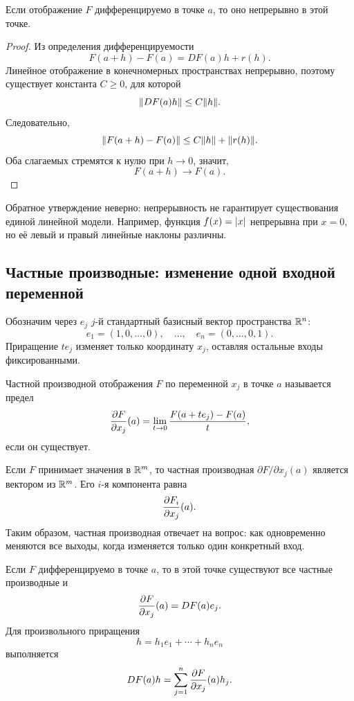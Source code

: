 \begin{theorem}
Если отображение \(F\) дифференцируемо в точке \(a\), то оно непрерывно в этой точке.
\end{theorem}

\begin{proof}
Из определения дифференцируемости
\[
F(a+h)-F(a)=DF(a)h+r(h).
\]
Линейное отображение в конечномерных пространствах непрерывно, поэтому существует константа \(C\geq0\), для которой
\[
\lVert DF(a)h\rVert\leq C\lVert h\rVert.
\]
Следовательно,
\[
\lVert F(a+h)-F(a)\rVert
\leq
C\lVert h\rVert+\lVert r(h)\rVert.
\]
Оба слагаемых стремятся к нулю при \(h\to0\), значит,
\[
F(a+h)\to F(a).
\]
\end{proof}

Обратное утверждение неверно: непрерывность не гарантирует существования единой линейной модели. Например, функция \(f(x)=\lvert x\rvert\) непрерывна при \(x=0\), но её левый и правый линейные наклоны различны.

\subsection{Частные производные: изменение одной входной переменной}

Обозначим через \(e_j\) \(j\)-й стандартный базисный вектор пространства \(\mathbb{R}^n\):
\[
e_1=(1,0,\dots,0),
\quad\dots,\quad
e_n=(0,\dots,0,1).
\]
Приращение \(t e_j\) изменяет только координату \(x_j\), оставляя остальные входы фиксированными.

\begin{definition}
Частной производной отображения \(F\) по переменной \(x_j\) в точке \(a\) называется предел
\begin{equation}
\frac{\partial F}{\partial x_j}(a)
=
\lim_{t\to0}
\frac{F(a+t e_j)-F(a)}{t},
\label{eq:partial-vector-map}
\end{equation}
если он существует.
\end{definition}

Если \(F\) принимает значения в \(\mathbb{R}^m\), то частная производная \(\partial F/\partial x_j(a)\) является вектором из \(\mathbb{R}^m\). Его \(i\)-я компонента равна
\[
\frac{\partial F_i}{\partial x_j}(a).
\]
Таким образом, частная производная отвечает на вопрос: как одновременно меняются все выходы, когда изменяется только один конкретный вход.

\begin{theorem}
Если \(F\) дифференцируемо в точке \(a\), то в этой точке существуют все частные производные и
\begin{equation}
\frac{\partial F}{\partial x_j}(a)=DF(a)e_j.
\label{eq:partial-as-column}
\end{equation}
Для произвольного приращения
\[
h=h_1e_1+\cdots+h_ne_n
\]
выполняется
\begin{equation}
DF(a)h
=
\sum_{j=1}^{n}
\frac{\partial F}{\partial x_j}(a)h_j.
\label{eq:differential-from-partials}
\end{equation}
\end{theorem}

